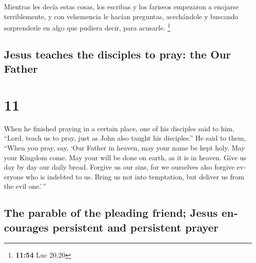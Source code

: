 \begin{paracol}{2}
 Mientras les decía estas cosas, los escribas y los
fariseos empezaron a enojarse terriblemente, y con vehemencia le hacían
preguntas,  acechándole y buscando sorprenderle en algo
que pudiera decir, para acusarle. \footnote{\textbf{11:54} Luc 20,20}

\switchcolumn
\begin{otherlanguage}{english}

\hypertarget{jesus-teaches-the-disciples-to-pray-the-our-father}{%
\subsection{Jesus teaches the disciples to pray: the Our
Father}\label{jesus-teaches-the-disciples-to-pray-the-our-father}}

\hypertarget{section-21}{%
\section{11}\label{section-21}}

 When he finished praying in a certain place, one of his
disciples said to him, ``Lord, teach us to pray, just as John also
taught his disciples.''  He said to them, ``When you pray,
say, `Our Father in heaven, may your name be kept holy. May your Kingdom
come. May your will be done on earth, as it is in heaven. 
Give us day by day our daily bread.  Forgive us our sins,
for we ourselves also forgive everyone who is indebted to us. Bring us
not into temptation, but deliver us from the evil one.'\,''

\hypertarget{the-parable-of-the-pleading-friend-jesus-encourages-persistent-and-persistent-prayer}{%
\subsection{The parable of the pleading friend; Jesus encourages
persistent and persistent
prayer}\label{the-parable-of-the-pleading-friend-jesus-encourages-persistent-and-persistent-prayer}}


\end{otherlanguage}
\end{paracol}
